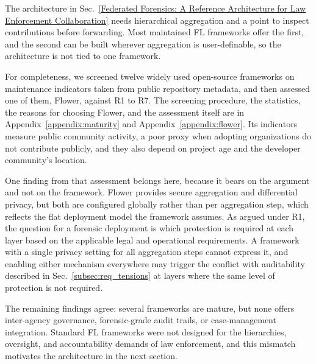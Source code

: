 The architecture in Sec.~\ref{Federated Forensics: A Reference Architecture for Law Enforcement Collaboration} needs hierarchical aggregation and a point to inspect contributions before forwarding. Most maintained FL frameworks offer the first, and the second can be built wherever aggregation is user-definable, so the architecture is not tied to one framework.

For completeness, we screened twelve widely used open-source frameworks on maintenance indicators taken from public repository metadata, and then assessed one of them, Flower, against R1 to R7. The screening procedure, the statistics, the reasons for choosing Flower, and the assessment itself are in Appendix~\ref{appendix:maturity} and Appendix~\ref{appendix:flower}. Its indicators measure public community activity, a poor proxy when adopting organizations do not contribute publicly, and they also depend on project age and the developer community's location.

One finding from that assessment belongs here, because it bears on the argument and not on the framework. Flower provides secure aggregation and differential privacy, but both are configured globally rather than per aggregation step, which reflects the flat deployment model the framework assumes. As argued under R1, the question for a forensic deployment is which protection is required at each layer based on the applicable legal and operational requirements. A framework with a single privacy setting for all aggregation steps cannot express it, and enabling either mechanism everywhere may trigger the conflict with auditability described in Sec.~\ref{subsec:req_tensions} at layers where the same level of protection is not required.


The remaining findings agree: several frameworks are mature, but none offers inter-agency governance, forensic-grade audit trails, or case-management integration. Standard FL frameworks were not designed for the hierarchies, oversight, and accountability demands of law enforcement, and this mismatch motivates the architecture in the next section.


